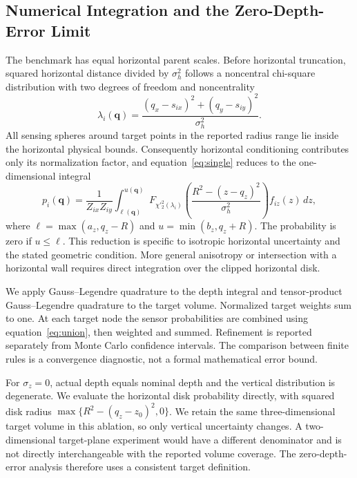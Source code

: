 \documentclass[fleqn,10pt]{wlscirep}
\begin{document}
\subsection*{Numerical Integration and the Zero-Depth-Error Limit}
The benchmark has equal horizontal parent scales. Before horizontal truncation, squared horizontal distance divided by $\sigma_h^2$ follows a noncentral chi-square distribution with two degrees of freedom and noncentrality
\begin{equation}\label{eq:noncentrality}
\lambda_i(\mathbf q)=\frac{(q_x-s_{ix})^2+(q_y-s_{iy})^2}{\sigma_h^2}.
\end{equation}
All sensing spheres around target points in the reported radius range lie inside the horizontal physical bounds. Consequently horizontal conditioning contributes only its normalization factor, and equation~\eqref{eq:single} reduces to the one-dimensional integral
\begin{equation}\label{eq:quadrature}
p_i(\mathbf q)=\frac{1}{Z_{ix}Z_{iy}}\int_{\ell(\mathbf q)}^{u(\mathbf q)}
F_{\chi'^2_2(\lambda_i)}\!\left(\frac{R^2-(z-q_z)^2}{\sigma_h^2}\right)f_{iz}(z)\,dz,
\end{equation}
where $\ell=\max(a_z,q_z-R)$ and $u=\min(b_z,q_z+R)$. The probability is zero if $u\le\ell$. This reduction is specific to isotropic horizontal uncertainty and the stated geometric condition. More general anisotropy or intersection with a horizontal wall requires direct integration over the clipped horizontal disk.

We apply Gauss--Legendre quadrature to the depth integral and tensor-product Gauss--Legendre quadrature to the target volume. Normalized target weights sum to one. At each target node the sensor probabilities are combined using equation~\eqref{eq:union}, then weighted and summed. Refinement is reported separately from Monte Carlo confidence intervals. The comparison between finite rules is a convergence diagnostic, not a formal mathematical error bound.

For $\sigma_z=0$, actual depth equals nominal depth and the vertical distribution is degenerate. We evaluate the horizontal disk probability directly, with squared disk radius $\max\{R^2-(q_z-z_0)^2,0\}$. We retain the same three-dimensional target volume in this ablation, so only vertical uncertainty changes. A two-dimensional target-plane experiment would have a different denominator and is not directly interchangeable with the reported volume coverage. The zero-depth-error analysis therefore uses a consistent target definition.
\end{document}
